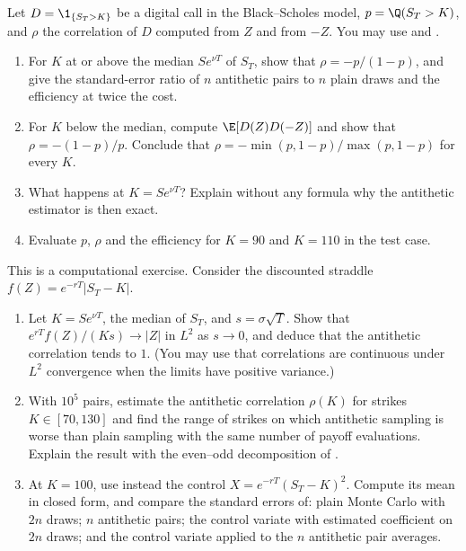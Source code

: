 
\begin{exercise}\label{ex:cv-digital}
\easy Let $D=\1_{\{S_T>K\}}$ be a digital call in the Black--Scholes model, $p=\Q(S_T>K)$,
and $\rho$ the correlation of $D$ computed from $Z$ and from $-Z$. You may use
 and .
\begin{enumerate}[label=(\alph*)]
  \item For $K$ at or above the median $Se^{\nu T}$ of $S_T$, show that
    $\rho=-p/(1-p)$, and give the standard-error ratio of $n$ antithetic pairs to $n$ plain
    draws and the efficiency at twice the cost.
  \item For $K$ below the median, compute $\E[D(Z)D(-Z)]$ and show that
    $\rho=-(1-p)/p$. Conclude that $\rho=-\min(p,1-p)/\max(p,1-p)$ for every $K$.
  \item What happens at $K=Se^{\nu T}$? Explain without any formula why the antithetic
    estimator is then exact.
  \item Evaluate $p$, $\rho$ and the efficiency for $K=90$ and $K=110$ in the test case.
\end{enumerate}
\end{exercise}

\begin{exercise}\label{ex:cv-straddle}
\medium This is a computational exercise. Consider the discounted straddle
$f(Z)=e^{-rT}|S_T-K|$.
\begin{enumerate}[label=(\alph*)]
  \item Let $K=Se^{\nu T}$, the median of $S_T$, and $s=\sigma\sqrt T$. Show that
    $e^{rT}f(Z)/(Ks)\to|Z|$ in $L^2$ as $s\to0$, and deduce that the antithetic correlation
    tends to $1$. (You may use that correlations are continuous under $L^2$ convergence when
    the limits have positive variance.)
  \item With $10^5$ pairs, estimate the antithetic correlation $\rho(K)$ for strikes
    $K\in[70,130]$ and find the range of strikes on which antithetic sampling is worse than
    plain sampling with the same number of payoff evaluations. Explain the result with the
    even--odd decomposition of .
  \item At $K=100$, use instead the control $X=e^{-rT}(S_T-K)^2$. Compute its mean in closed
    form, and compare the standard errors of: plain Monte Carlo with $2n$ draws; $n$
    antithetic pairs; the control variate with estimated coefficient on $2n$ draws; and the
    control variate applied to the $n$ antithetic pair averages.
\end{enumerate}
\end{exercise}

